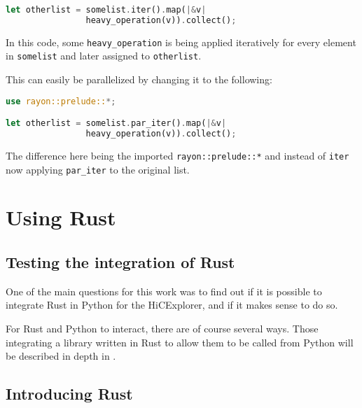 \vline
\begin{lstlisting}[language=Rust]
let otherlist = somelist.iter().map(|&v|
                heavy_operation(v)).collect();
\end{lstlisting}
\vline

In this code, some \verb|heavy_operation| is being applied iteratively for every element in \verb|somelist| and later assigned to \verb|otherlist|.

This can easily be parallelized by changing it to the following:

\vline
\begin{lstlisting}[language=Rust]
use rayon::prelude::*;

let otherlist = somelist.par_iter().map(|&v|
                heavy_operation(v)).collect();
\end{lstlisting}
\vline

The difference here being the imported \verb|rayon::prelude::*| and instead of
\verb|iter| now applying \verb|par_iter| to the original list.





\newpage
\section{Using Rust}\label{sec:rust}


\subsection{Testing the integration of Rust}


One of the main questions for this work was to find out if it is possible to
integrate Rust in Python for the HiCExplorer, and if it makes sense to do so.


For Rust and Python to interact, there are of course several ways. Those
integrating a library written in Rust to allow them to be called from Python
will be described in depth in .





\subsection{Introducing Rust}

